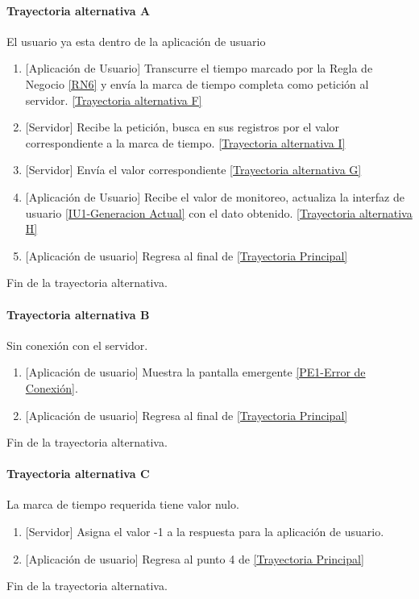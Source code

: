 \paragraph{Trayectoria alternativa A} \label{SUB-U-CU1.5:TA}
	El usuario ya esta dentro de la aplicación de usuario
	\begin{enumerate}[label=A\arabic*.]
		\item {[Aplicación de Usuario]} Transcurre el tiempo marcado por la Regla de Negocio \ref{RN6} y envía la marca de tiempo completa como petición al servidor. \hyperref[SUB-U-CU1.5:TF]{[Trayectoria alternativa F]} 
		\item {[Servidor]} Recibe la petición, busca en sus registros por el valor correspondiente a la marca de tiempo. \hyperref[SUB-U-CU1.5:TI]{[Trayectoria alternativa I]} 
		\item  {[Servidor]} Envía el valor correspondiente \hyperref[SUB-U-CU1.5:TG]{[Trayectoria alternativa G]}
        \item {[Aplicación de Usuario]} Recibe el valor de monitoreo, actualiza la interfaz de usuario \hyperref[fig:monitoreo]{[IU1-Generacion Actual]} con el dato obtenido.
        \hyperref[SUB-U-CU1.5:TH]{[Trayectoria alternativa H]}
        \item {[Aplicación de usuario]} Regresa al final de \hyperref[SUB-U-CU1.5:TP]{[Trayectoria Principal]}
	\end{enumerate}
	Fin de la trayectoria alternativa.

\paragraph{Trayectoria alternativa B} \label{SUB-U-CU1.5:TB}
	Sin conexión con el servidor.
	\begin{enumerate}[label=B\arabic*.]
		\item {[Aplicación de usuario]} Muestra la pantalla emergente \hyperref[fig:Error de Conexion]{[PE1-Error de Conexión]}.
		\item {[Aplicación de usuario]} Regresa al final de \hyperref[SUB-U-CU1.5:TP]{[Trayectoria Principal]}
	\end{enumerate}
	Fin de la trayectoria alternativa.

\paragraph{Trayectoria alternativa C} \label{SUB-U-CU1.5:TC}
	La marca de tiempo requerida tiene valor nulo.
	\begin{enumerate}[label=C\arabic*.]
		\item {[Servidor]} Asigna el valor -1 a la respuesta para la aplicación de usuario.
		\item {[Aplicación de usuario]} Regresa al punto 4 de \hyperref[SUB-U-CU1.5:TP]{[Trayectoria Principal]}
	\end{enumerate}
	Fin de la trayectoria alternativa.

